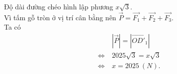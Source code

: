 \begin{bt}
{		Độ dài đường chéo hình lập phương $x\sqrt{3}$.\\
		Vì tấm gỗ tròn ở vị trí cân bằng nên $\overrightarrow{P}=\overrightarrow{F_1}+\overrightarrow{F_2}+ \overrightarrow{F_3}$.\\
		Ta có
		\begin{align*}
			&~\left| \overrightarrow{P}\right|=\left| \overrightarrow{OD'_1}\right|\\ 
			\Leftrightarrow &~2025\sqrt{3}=x\sqrt{3}\\ 
			\Leftrightarrow &~x=2025~(N).
		\end{align*}
	}
\end{bt}

\begin{bt}%


\end{bt}
